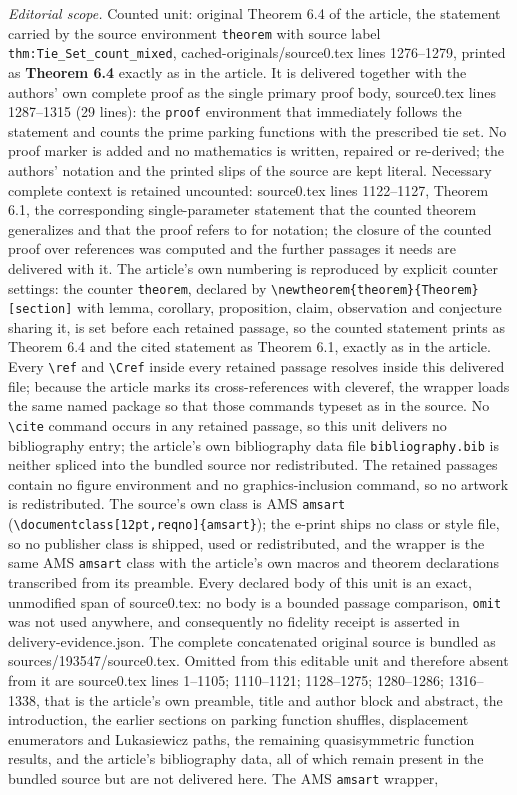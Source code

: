 \documentclass[10pt,a4paper]{amsart}
\theoremstyle{definition}
\theoremstyle{remark}
\begin{document}
\noindent\textit{Editorial scope.} Counted unit: original Theorem 6.4 of the article, the statement carried by the source environment \texttt{theorem} with source label \texttt{thm:Tie\_Set\_count\_mixed}, cached-originals/source0.tex lines 1276--1279, printed as \textbf{Theorem 6.4} exactly as in the article. It is delivered together with the authors' own complete proof as the single primary proof body, source0.tex lines 1287--1315 (29 lines): the \texttt{proof} environment that immediately follows the statement and counts the prime parking functions with the prescribed tie set. No proof marker is added and no mathematics is written, repaired or re-derived; the authors' notation and the printed slips of the source are kept literal. Necessary complete context is retained uncounted: source0.tex lines 1122--1127, Theorem 6.1, the corresponding single-parameter statement that the counted theorem generalizes and that the proof refers to for notation; the closure of the counted proof over references was computed and the further passages it needs are delivered with it. The article's own numbering is reproduced by explicit counter settings: the counter \texttt{theorem}, declared by \texttt{\textbackslash newtheorem\{theorem\}\{Theorem\}[section]} with lemma, corollary, proposition, claim, observation and conjecture sharing it, is set before each retained passage, so the counted statement prints as Theorem 6.4 and the cited statement as Theorem 6.1, exactly as in the article. Every \texttt{\textbackslash ref} and \texttt{\textbackslash Cref} inside every retained passage resolves inside this delivered file; because the article marks its cross-references with cleveref, the wrapper loads the same named package so that those commands typeset as in the source. No \texttt{\textbackslash cite} command occurs in any retained passage, so this unit delivers no bibliography entry; the article's own bibliography data file \texttt{bibliography.bib} is neither spliced into the bundled source nor redistributed. The retained passages contain no figure environment and no graphics-inclusion command, so no artwork is redistributed. The source's own class is AMS \texttt{amsart} (\texttt{\textbackslash documentclass[12pt,reqno]\{amsart\}}); the e-print ships no class or style file, so no publisher class is shipped, used or redistributed, and the wrapper is the same AMS \texttt{amsart} class with the article's own macros and theorem declarations transcribed from its preamble. Every declared body of this unit is an exact, unmodified span of source0.tex: no body is a bounded passage comparison, \texttt{omit} was not used anywhere, and consequently no fidelity receipt is asserted in delivery-evidence.json. The complete concatenated original source is bundled as sources/193547/source0.tex. Omitted from this editable unit and therefore absent from it are source0.tex lines 1--1105; 1110--1121; 1128--1275; 1280--1286; 1316--1338, that is the article's own preamble, title and author block and abstract, the introduction, the earlier sections on parking function shuffles, displacement enumerators and Lukasiewicz paths, the remaining quasisymmetric function results, and the article's bibliography data, all of which remain present in the bundled source but are not delivered here. The AMS \texttt{amsart} wrapper, 
\end{document}
